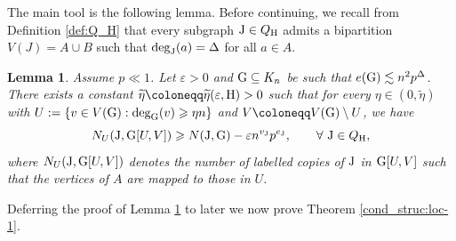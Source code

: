 \documentclass[a4paper,11pt,english,reqno]{amsart}
\numberwithin{equation}{section}
\renewcommand{\geq}{\geqslant}
\newcommand{\uH}{\textup{H}}
\newcommand{\tu}[1]{\textup{#1}}
\newtheorem{lemma}[theorem]{Lemma}
\begin{document}
			The main tool is the following lemma. Before continuing, we recall from Definition \ref{def:Q_H} that every subgraph $\tu{J}\in Q_{\uH}$ admits a bipartition $V(J) = A\cup B$ such that $\tu{deg}_{\tu{J}}(a)=\Delta$ for all $a\in A$.
			\begin{lemma}
				\label{cond_struc: bipartite lemma}
				Assume $ p\ll 1$. Let $\varepsilon> 0$ and $\tu{G}\subseteq K_{n}$ be such that $e(\tu{G})\lesssim  n^{2}p^{\Delta}$.
				There exists a constant $\widetilde \eta\coloneqq \widetilde \eta(\varepsilon,\uH)>0$ such that for every $\eta \in (0,\widetilde \eta)$ with $U:=\{v\in V(\tu{G}): \tu{deg}_{\tu{G}}(v)\geq \eta n\}$ and $V \coloneqq V(\tu{G})\setminus U$, we have
				\begin{equation*}
					N_{U}(\tu{J}, \tu{G}[U,V]) \geq N(\tu{J},\tu{G})-\varepsilon n^{v_{\tu{J}}}p^{e_{\tu{J}}}, \qquad \forall\ \tu{J}\in Q_{\tu{H}},
				\end{equation*} 
				where %
				$N_{U}(\tu{J},\tu{G}[U,V])$ denotes the number of labelled copies of $\tu{J}$ in $\tu{G}[U,V]$ such that the vertices of $A$ are mapped to those in $U$. %
			\end{lemma}
			
			
			Deferring the proof of Lemma \ref{cond_struc: bipartite lemma} to later we now prove Theorem \ref{cond_struc:loc-1}.
			
\end{document}

